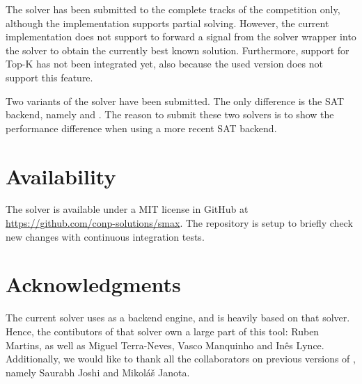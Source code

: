 \documentclass[conference]{IEEEtran}
\begin{document}
The solver has been submitted to the complete tracks of the competition only, although the implementation supports partial solving.
However, the current implementation does not support to forward a signal from the solver wrapper into the solver to obtain the currently best known solution.
Furthermore, support for Top-K has not been integrated yet, also because the used \openwbo version does not support this feature.

Two variants of the solver have been submitted.
The only difference is the SAT backend, namely \minisat and \mergesat.
The reason to submit these two solvers is to show the performance difference when using a more recent SAT backend.

\section{Availability}

The solver \smax is available under a MIT license in GitHub at \url{https://github.com/conp-solutions/smax}.
The repository is setup to briefly check new changes with continuous integration tests.

\section*{Acknowledgments}

The current solver uses \openwbo as a backend engine, and is heavily based on that solver.
Hence, the contibutors of that solver own a large part of this tool: Ruben Martins, as well as Miguel Terra-Neves, Vasco Manquinho and In\^es Lynce.
Additionally, we would like to thank all the collaborators on previous versions of \openwbo, namely Saurabh Joshi and Mikol{\'a}{\v{s}} Janota. 

\balance


\end{document}
